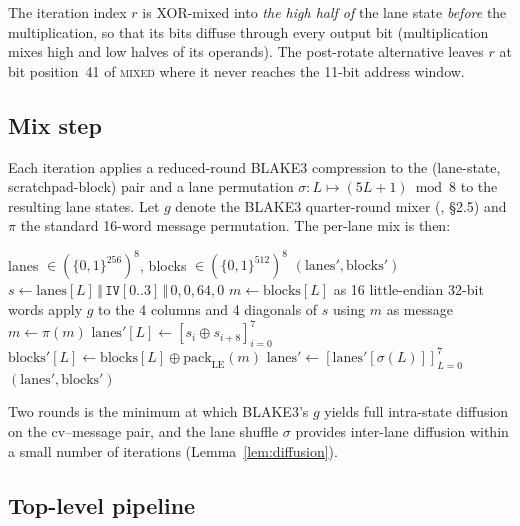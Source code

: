 \documentclass[11pt,a4paper]{article}
\theoremstyle{plain}
\theoremstyle{definition}
\theoremstyle{remark}
\begin{document}
The iteration index $r$ is XOR-mixed into \emph{the high half of} the
lane state \emph{before} the multiplication, so that its bits
diffuse through every output bit (multiplication mixes high and low
halves of its operands). The post-rotate alternative leaves $r$ at
bit position~41 of \textsc{mixed} where it never reaches the 11-bit
address window.

\subsection{Mix step}\label{sec:algo-mix}

Each iteration applies a reduced-round BLAKE3 compression to the
(lane-state, scratchpad-block) pair and a lane permutation
$\sigma\colon L\mapsto (5L+1)\bmod 8$ to the resulting lane states.
Let $g$ denote the BLAKE3 quarter-round mixer
(\cite{oconnor2020blake3}, \S2.5) and $\pi$ the standard 16-word
message permutation. The per-lane mix is then:

\begin{algorithm}[t]
\caption{\textsc{MixStep}; one iteration's lane-local mixing.
\texttt{INNER\_ROUNDS}~$=2$.}
\label{alg:mix}
\begin{algorithmic}[1]
\Require lanes $\in (\{0,1\}^{256})^8$,
         blocks $\in (\{0,1\}^{512})^8$
\Ensure $(\text{lanes}', \text{blocks}')$
  \State $s \gets \text{lanes}[L] \,\Vert\, \texttt{IV}[0..3]
         \,\Vert\, 0, 0, 64, 0$
  \State $m \gets \text{blocks}[L]$ as 16 little-endian 32-bit words
    \State apply $g$ to the 4 columns and 4 diagonals of $s$ using
           $m$ as message
    \State $m \gets \pi(m)$
  \EndFor
  \State $\text{lanes}'[L] \gets [s_i \oplus s_{i+8}]_{i=0}^{7}$
  \State $\text{blocks}'[L] \gets \text{blocks}[L] \oplus
         \mathrm{pack}_\text{LE}(m)$
\EndFor
\State $\text{lanes}' \gets [\text{lanes}'[\sigma(L)]]_{L=0}^{7}$
\State \Return $(\text{lanes}', \text{blocks}')$
\end{algorithmic}
\end{algorithm}

Two rounds is the minimum at which BLAKE3's $g$ yields full
intra-state diffusion on the cv--message pair, and the lane shuffle
$\sigma$ provides inter-lane diffusion within a small number of
iterations (Lemma~\ref{lem:diffusion}).

\subsection{Top-level pipeline}\label{sec:algo-top}
\end{document}
